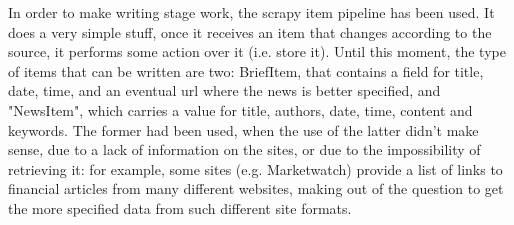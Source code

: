 In order to make writing stage work, the scrapy item pipeline \cite{scrapypipeline} has been used. It does a very simple stuff, once it receives an item that changes according to the source, it performs some action over it (i.e. store it). Until this moment, the type of items that can be written are two: BriefItem, that contains a field for title, date, time, and an eventual url where the news is better specified, and "NewsItem", which carries a value for title, authors, date, time, content and keywords. The former had been used, when the use of the latter didn't make sense, due to a lack of information on the sites, or due to the impossibility of retrieving it: for example, some sites (e.g. Marketwatch) provide a list of links to financial articles from many different websites, making out of the question to get the more specified data from such different site formats. \\   


